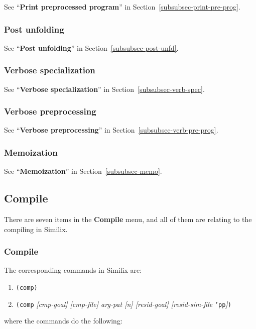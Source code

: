\begin{sloppypar}
See ``{\bf Print preprocessed program}'' in
Section~\ref{subsubsec-print-pre-prog}.

\subsubsection{Post unfolding}

See ``{\bf Post unfolding}'' in
Section~\ref{subsubsec-post-unfd}.

\subsubsection{Verbose specialization}

See ``{\bf Verbose specialization}'' in
Section~\ref{subsubsec-verb-spec}.

\subsubsection{Verbose preprocessing}

See ``{\bf Verbose preprocessing}'' in
Section~\ref{subsubsec-verb-pre-prog}.

\subsubsection{Memoization}

See ``{\bf Memoization}'' in
Section~\ref{subsubsec-memo}.


\subsection{Compile}


There are seven items in the {\bf Compile} menu, and all of them are
relating to the compiling in Similix.


\subsubsection{Compile}


The corresponding commands in Similix are:

\begin{enumerate}
\item {\tt (comp)}
\item {\tt (comp} {\it [cmp-goal] [cmp-file] arg-pat [n] [resid-goal]
      [resid-sim-file} {\tt 'pp}{\it ]}{\tt )}
\end{enumerate}

\noindent where the commands do the following:


\end{sloppypar}
